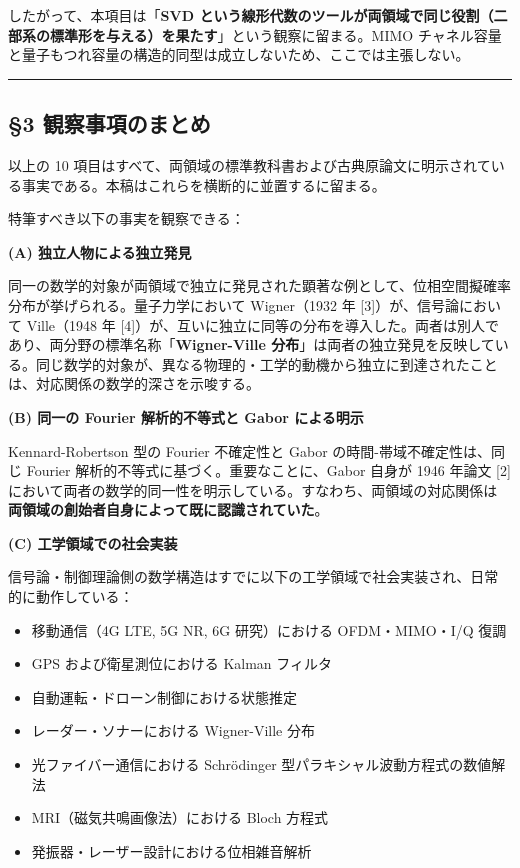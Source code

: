 \documentclass[
]{ltjsarticle}
\providecommand{\tightlist}{%
  \setlength{\itemsep}{0pt}\setlength{\parskip}{0pt}}
\begin{document}
したがって、本項目は「\textbf{SVD
という線形代数のツールが両領域で同じ役割（二部系の標準形を与える）を果たす}」という観察に留まる。MIMO
チャネル容量と量子もつれ容量の構造的同型は成立しないため、ここでは主張しない。

\begin{center}\rule{0.5\linewidth}{0.5pt}\end{center}

\subsection{§3
観察事項のまとめ}\label{ux89b3ux5bdfux4e8bux9805ux306eux307eux3068ux3081}

以上の 10
項目はすべて、両領域の標準教科書および古典原論文に明示されている事実である。本稿はこれらを横断的に並置するに留まる。

特筆すべき以下の事実を観察できる：

\textbf{(A) 独立人物による独立発見}

同一の数学的対象が両領域で独立に発見された顕著な例として、位相空間擬確率分布が挙げられる。量子力学において
Wigner（1932 年 {[}3{]}）が、信号論において Ville（1948 年
{[}4{]}）が、互いに独立に同等の分布を導入した。両者は別人であり、両分野の標準名称「\textbf{Wigner-Ville
分布}」は両者の独立発見を反映している。同じ数学的対象が、異なる物理的・工学的動機から独立に到達されたことは、対応関係の数学的深さを示唆する。

\textbf{(B) 同一の Fourier 解析的不等式と Gabor による明示}

Kennard-Robertson 型の Fourier 不確定性と Gabor
の時間-帯域不確定性は、同じ Fourier
解析的不等式に基づく。重要なことに、Gabor 自身が 1946 年論文 {[}2{]}
において両者の数学的同一性を明示している。すなわち、両領域の対応関係は
\textbf{両領域の創始者自身によって既に認識されていた}。

\textbf{(C) 工学領域での社会実装}

信号論・制御理論側の数学構造はすでに以下の工学領域で社会実装され、日常的に動作している：

\begin{itemize}
\tightlist
\item
  移動通信（4G LTE, 5G NR, 6G 研究）における OFDM・MIMO・I/Q 復調
\item
  GPS および衛星測位における Kalman フィルタ
\item
  自動運転・ドローン制御における状態推定
\item
  レーダー・ソナーにおける Wigner-Ville 分布
\item
  光ファイバー通信における Schrödinger
  型パラキシャル波動方程式の数値解法
\item
  MRI（磁気共鳴画像法）における Bloch 方程式
\item
  発振器・レーザー設計における位相雑音解析
\end{itemize}
\end{document}

